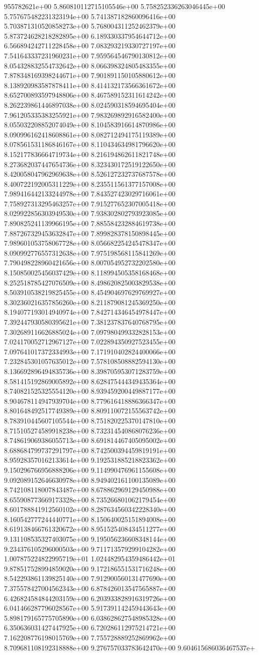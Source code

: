 955782621e+00	5.860810112715105546e+00	5.758252336263046445e+00	5.757675482231323194e+00	5.741387182860096416e+00	5.703871310520858273e+00	5.768004311252462379e+00	5.873724628218282895e+00	6.189330337954644712e+00	6.566894242711228458e+00	7.083293219330727197e+00	7.541643337231960231e+00	7.959564546790130812e+00	8.054328832554732642e+00	8.066398324805483355e+00	7.878348169398244671e+00	7.901891150105880612e+00	8.138920983587878411e+00	8.414132173566361672e+00	8.652700893597948806e+00	8.467589152311614242e+00	8.262239861446897038e+00	8.024590318594695404e+00	7.961205335383255921e+00	7.983269892916582400e+00	8.055032208852074049e+00	8.104583916614870986e+00	8.090996162418608861e+00	8.082712494175119389e+00	8.078561531186846167e+00	8.110434634981796620e+00	8.152177836664719734e+00	8.216194862611821748e+00	8.273682037447654736e+00	8.323430172519122650e+00	8.420058047962969638e+00	8.526127232737687578e+00	8.400722192005311229e+00	8.235511561377157008e+00	7.989416442133244978e+00	7.843527423029716061e+00	7.758927313295463257e+00	7.915277652307005418e+00	8.029922856303949530e+00	7.938302802793923085e+00	7.890825241139966195e+00	7.885584232884619738e+00	7.887267329453632847e+00	7.899828378150898445e+00	7.989601053758067728e+00	8.056682254245478347e+00	8.090992776557312638e+00	7.975198568115841269e+00	7.790498228960421656e+00	8.007054952732202580e+00	8.150850025456037429e+00	8.118994505358168468e+00	8.252518785427076509e+00	8.498620825003829538e+00	8.503910538219825455e+00	8.454904697629769927e+00	8.302360216357856260e+00	8.211879081245369250e+00	8.194077193014940974e+00	7.842714346454978447e+00	7.392447930580395621e+00	7.381237837640768795e+00	7.302689116626885024e+00	7.097980499332828153e+00	7.024170052712967127e+00	7.022894350927523455e+00	7.097641017372334993e+00	7.171910402824400066e+00	7.232845301057635012e+00	7.578108508882594130e+00	8.136692896494835736e+00	8.398705953071283759e+00	8.581415192869005892e+00	8.628475444349435364e+00	8.740821525325554120e+00	8.939459200449887177e+00	8.904678114947939704e+00	8.779616418886366347e+00	8.801648492517749389e+00	8.809110072155563742e+00	8.783910445607105544e+00	8.751820225370147810e+00	8.715105274589918238e+00	8.732314540868076236e+00	8.748619069386055713e+00	8.691814467405095002e+00	8.688684799737291797e+00	8.742500394459819191e+00	8.959283570162133614e+00	9.192531885218823362e+00	9.150296766956888206e+00	9.114990476961155608e+00	9.092089152646630978e+00	8.949402161100135089e+00	8.742108118007843487e+00	8.678862969129450988e+00	8.655908773669173328e+00	8.735266801062179454e+00	8.601788841912560102e+00	8.287634560342228340e+00	8.160542777244440771e+00	8.150640025151894008e+00	8.619138466761320672e+00	8.951525408434511277e+00	9.131108535327403075e+00	9.195056236608348144e+00	9.234376105296000503e+00	9.711713579299104282e+00	1.007875224822995719e+01	1.024482954359486442e+01	9.878517528994859020e+00	9.172186551531716248e+00	8.542293861139825140e+00	7.912900560131477690e+00	7.375578427004562343e+00	6.878426013547565887e+00	6.426824584844203159e+00	6.203933828916319726e+00	6.041466287796028567e+00	5.917391142459443643e+00	5.898179165775705890e+00	6.038628627548985328e+00	6.350636031427447925e+00	6.720286112975214721e+00	7.162208776198015769e+00	7.755728889252869962e+00	8.709681108192318888e+00	9.276757033783642470e+00	9.604615686036467537e+